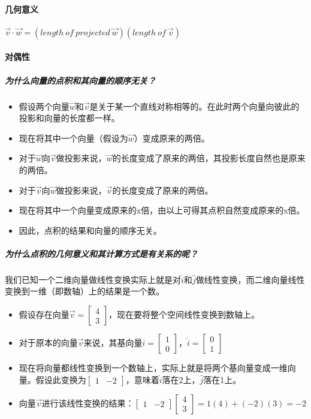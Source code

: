\documentclass[UTF8]{ctexart}
\begin{document}
\paragraph{几何意义}
$\overrightarrow{v}\cdot\overrightarrow{w} = (length\ of\ projected\ \overrightarrow{w})(length\ of\ \overrightarrow{v})$
\paragraph{对偶性}
\subparagraph{为什么向量的点积和其向量的顺序无关？}
\begin{itemize}
	\item 假设两个向量$\overrightarrow{w}$和$\overrightarrow{v}$是关于某一个直线对称相等的。在此时两个向量向彼此的投影和向量的长度都一样。
	\item 现在将其中一个向量（假设为$\overrightarrow{w}$）变成原来的两倍。
	\item 对于$\overrightarrow{w}$向$\overrightarrow{v}$做投影来说，$\overrightarrow{w}$的长度变成了原来的两倍，其投影长度自然也是原来的两倍。
	\item 对于$\overrightarrow{v}$向$\overrightarrow{w}$做投影来说，$\overrightarrow{v}$的长度变成了原来的两倍。
	\item 现在将其中一个向量变成原来的x倍，由以上可得其点积自然变成原来的x倍。
	\item 因此，点积的结果和向量的顺序无关。
\end{itemize}
\subparagraph{为什么点积的几何意义和其计算方式是有关系的呢？}
我们已知一个二维向量做线性变换实际上就是对$\hat{i}$和$\hat{j}$做线性变换，而二维向量线性变换到一维（即数轴）上的结果是一个数。
\begin{itemize}
	\item 假设存在向量$\overrightarrow{v} = \begin{bmatrix}
		4 \\ 3
	\end{bmatrix}$，现在要将整个空间线性变换到数轴上。
	\item 对于原本的向量$\overrightarrow{v}$来说，其基向量$\hat{i} = \begin{bmatrix}
		1 \\ 0
	\end{bmatrix}$，$\hat{i} = \begin{bmatrix}
		0 \\ 1
	\end{bmatrix}$
	\item 现在将向量都线性变换到一个数轴上，实际上就是将两个基向量变成一维向量。假设此变换为$\begin{bmatrix}
		1 & -2
	\end{bmatrix}$，意味着$\hat{i}$落在2上，$\hat{j}$落在1上。
	\item 向量$\overrightarrow{v}$进行该线性变换的结果：$\begin{bmatrix}
		1 & -2
	\end{bmatrix} \begin{bmatrix}
		4 \\ 3
	\end{bmatrix} = 1(4) + (-2)(3) = -2$
\end{itemize}
\end{document}

